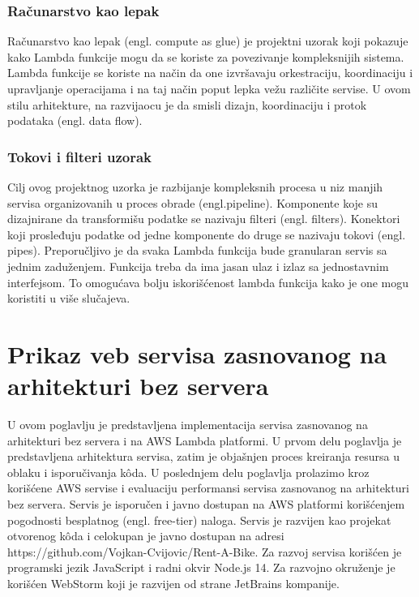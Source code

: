 \documentclass[12pt,oneside]{memoir}
\begin{document}
\subsection{Računarstvo kao lepak} %
Računarstvo kao lepak (engl. compute as glue) je projektni uzorak koji pokazuje kako Lambda funkcije mogu da se koriste za povezivanje kompleksnijih sistema. Lambda funkcije se koriste na način da one izvršavaju orkestraciju, koordinaciju i upravljanje operacijama i na taj način poput lepka vežu različite servise. U ovom stilu arhitekture, na razvijaocu je da smisli dizajn, koordinaciju i protok podataka (engl. data flow). 
 
\subsection{Tokovi i filteri uzorak}
Cilj ovog projektnog uzorka je razbijanje kompleksnih procesa u niz manjih servisa organizovanih u proces obrade (engl.pipeline). Komponente koje su dizajnirane da transformišu podatke se nazivaju filteri (engl. filters). Konektori koji prosleđuju podatke od jedne komponente do druge se nazivaju tokovi (engl. pipes). Preporučljivo je da svaka Lambda funkcija bude granularan servis sa jednim zaduženjem. Funkcija treba da ima jasan ulaz i izlaz sa jednostavnim interfejsom. To omogućava bolju iskorišćenost lambda funkcija kako je one mogu koristiti u više slučajeva.


\chapter{Prikaz veb servisa zasnovanog na arhitekturi bez servera}
 
U ovom poglavlju je predstavljena implementacija servisa zasnovanog na arhitekturi bez servera i na AWS Lambda platformi. U prvom delu poglavlja je predstavljena arhitektura servisa, zatim je objašnjen proces kreiranja resursa u oblaku i isporučivanja kôda. U poslednjem delu poglavlja prolazimo kroz korišćene AWS servise i evaluaciju performansi servisa zasnovanog na arhitekturi bez servera. Servis je isporučen i javno dostupan na AWS platformi korišćenjem pogodnosti besplatnog (engl. free-tier) naloga. Servis je razvijen kao projekat otvorenog kôda i celokupan je javno dostupan na adresi https://github.com/Vojkan-Cvijovic/Rent-A-Bike. Za razvoj servisa korišćen je programski jezik JavaScript i radni okvir Node.js 14. Za razvojno okruženje je korišćen WebStorm koji je razvijen od strane JetBrains kompanije.
\end{document}
